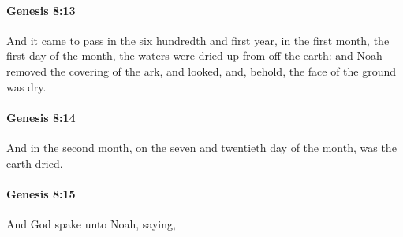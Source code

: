 		\paragraph{Genesis 8:13} %
			\label{GENESIS-8-13}

			And it came to pass in the six hundredth and first year, in the first month, the first day of the month, the waters were dried up from off the earth: and Noah removed the covering of the ark, and looked, and, behold, the face of the ground was dry.


		\paragraph{Genesis 8:14} %
			\label{GENESIS-8-14}

			And in the second month, on the seven and twentieth day of the month, was the earth dried.


		\paragraph{Genesis 8:15} %
			\label{GENESIS-8-15}

			And God spake unto Noah, saying,


